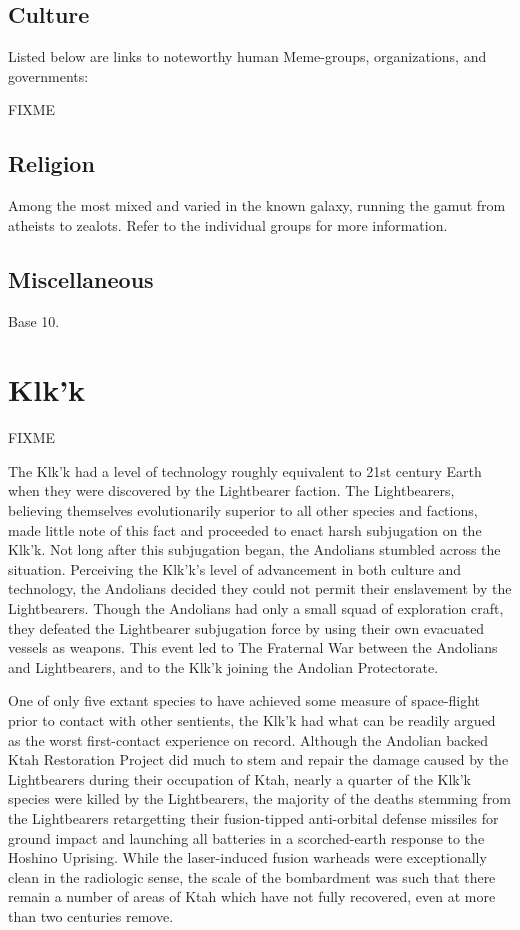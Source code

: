 \subsection{Culture}
Listed below are links to noteworthy human Meme-groups, organizations,
and governments:

FIXME 

\subsection{Religion}
Among the most mixed and varied in the known galaxy, running the gamut
from atheists to zealots. Refer to the individual groups for more
information.

\subsection{Miscellaneous}
Base 10. 

\section{Klk'k}
FIXME

The Klk'k had a level of technology roughly equivalent to 21st century Earth when they were discovered by the Lightbearer faction. The Lightbearers, believing themselves evolutionarily superior to all other species and factions, made little note of this fact and proceeded to enact harsh subjugation on the Klk'k. Not long after this subjugation began, the Andolians stumbled across the situation. Perceiving the Klk'k's level of advancement in both culture and technology, the Andolians decided they could not permit their enslavement by the Lightbearers. Though the Andolians had only a small squad of exploration craft, they defeated the Lightbearer subjugation force by using their own evacuated vessels as weapons.
This event led to The Fraternal War between the Andolians and Lightbearers, and to the Klk'k joining the Andolian Protectorate.

One of only five extant species to have achieved some measure of
space-flight prior to contact with other sentients, the Klk'k had what
can be readily argued as the worst first-contact experience on
record. Although the Andolian backed Ktah Restoration Project did much
to stem and repair the damage caused by the Lightbearers during their
occupation of Ktah, nearly a quarter of the Klk'k species were killed
by the Lightbearers, the majority of the deaths stemming from the
Lightbearers retargetting their fusion-tipped anti-orbital defense
missiles for ground impact and launching all batteries in a
scorched-earth response to the Hoshino Uprising. While the
laser-induced fusion warheads were exceptionally clean in the
radiologic sense, the scale of the bombardment was such that there
remain a number of areas of Ktah which have not fully recovered, even
at more than two centuries remove.

